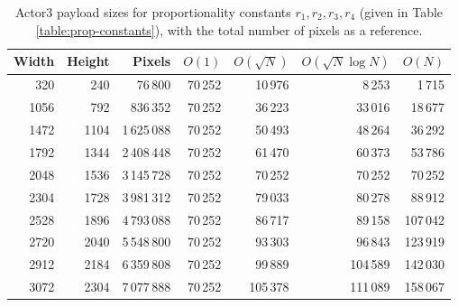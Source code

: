 \documentclass[11pt,a4paper,twoside,openright]{report}
\begin{document}
\begin{appendices}
\begin{table}[htbp]
\begin{center}
\begin{tabular}{ | r r | r | r r r r | }
\hline
Width & Height & Pixels & $O(1)$ & $O(\sqrt{N})$ & $O(\sqrt{N} \log N)$ & $O(N)$ \\ \hline
320 & 240 & 76\,800 & 70\,252 & 10\,976 & 8\,253 & 1\,715 \\
1056 & 792 & 836\,352 & 70\,252 & 36\,223 & 33\,016 & 18\,677 \\
1472 & 1104 & 1\,625\,088 & 70\,252 & 50\,493 & 48\,264 & 36\,292 \\
1792 & 1344 & 2\,408\,448 & 70\,252 & 61\,470 & 60\,373 & 53\,786 \\
2048 & 1536 & 3\,145\,728 & 70\,252 & 70\,252 & 70\,252 & 70\,252 \\
2304 & 1728 & 3\,981\,312 & 70\,252 & 79\,033 & 80\,278 & 88\,912 \\
2528 & 1896 & 4\,793\,088 & 70\,252 & 86\,717 & 89\,158 & 107\,042 \\
2720 & 2040 & 5\,548\,800 & 70\,252 & 93\,303 & 96\,843 & 123\,919 \\
2912 & 2184 & 6\,359\,808 & 70\,252 & 99\,889 & 104\,589 & 142\,030 \\
3072 & 2304 & 7\,077\,888 & 70\,252 & 105\,378 & 111\,089 & 158\,067 \\ \hline
\end{tabular}
\caption{Actor3 payload sizes for proportionality constants $r_1, r_2, r_3, r_4$ (given in Table \ref{table:prop-constants}), with the total number of pixels as a reference.}
\end{center}
\end{table}


\end{appendices}
\end{document}
